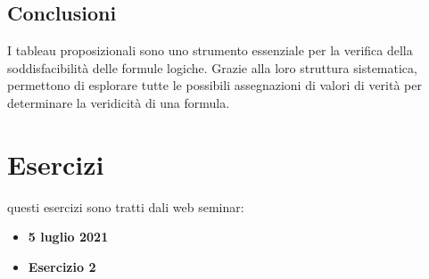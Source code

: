 \documentclass{article}
\begin{document}
\subsection{Conclusioni}

I tableau proposizionali sono uno strumento essenziale per la verifica della soddisfacibilità delle formule logiche. Grazie alla loro struttura sistematica, permettono di esplorare tutte le possibili assegnazioni di valori di verità per determinare la veridicità di una formula.

\newpage
\section{Esercizi}
questi esercizi sono tratti dali web seminar:
\begin{itemize}
    \item \textbf{5 luglio 2021}
    \item \textbf{Esercizio 2}
\end{itemize}
\end{document}
